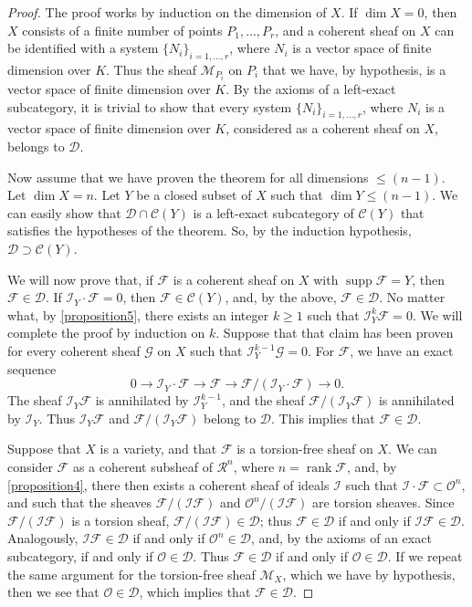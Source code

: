 \documentclass{article}
\theoremstyle{plain}
\theoremstyle{definition}
\newcommand{\sh}{\mathscr}
\newcommand{\cat}{\mathcal}
\renewcommand{\geq}{\geqslant}
\renewcommand{\leq}{\leqslant}
\DeclareMathOperator{\supp}{supp}
\DeclareMathOperator{\rank}{rank}
\newcommand{\oldpage}[1]{\marginpar{\footnotesize$\Big\vert$ \textit{p.~#1}}}
\begin{document}
\begin{proof}
  The proof works by induction on the dimension of $X$.
  If $\dim X=0$, then $X$ consists of a finite number of points $P_1,\ldots,P_r$, and a coherent sheaf on $X$ can be identified with a system $\{N_i\}_{i=1,\ldots,r}$, where $N_i$ is a vector space of finite dimension over $K$.
  Thus the sheaf $\sh{M}_{P_i}$ on $P_i$ that we have, by hypothesis, is a vector space of finite dimension over $K$.
  By the axioms of a left-exact subcategory, it is trivial to show that every system $\{N_i\}_{i=1,\ldots,r}$, where $N_i$ is a vector space of finite dimension over $K$, considered as a coherent sheaf on $X$, belongs to $\cat{D}$.

  Now assume that we have proven the theorem for all dimensions $\leq (n-1)$.
  Let $\dim X=n$.
  Let $Y$ be a closed subset of $X$ such that $\dim Y\leq(n-1)$.
  We can easily show that $\cat{D}\cap\cat{C}(Y)$ is a left-exact subcategory of $\cat{C}(Y)$ that satisfies the hypotheses of the theorem.
  So, by the induction hypothesis, $\cat{D}\supset\cat{C}(Y)$.

  We will now prove that, if $\sh{F}$ is a coherent sheaf on $X$ with $\supp\sh{F}=Y$, then $\sh{F}\in\cat{D}$.
  If $\sh{I}_Y\cdot\sh{F}=0$, then $\sh{F}\in\cat{C}(Y)$, and, by the above, $\sh{F}\in\cat{D}$.
  No matter what, by \cref{proposition5}, there exists an integer $k\geq1$ such that $\sh{I}_Y^k\sh{F}=0$.
  We will complete the proof by induction on $k$.
  Suppose that that claim has been proven for every coherent sheaf $\sh{G}$ on $X$ such that $\sh{I}_Y^{k-1}\sh{G}=0$.
  For $\sh{F}$, we have an exact sequence
  \[
    0 \to \sh{I}_Y\cdot\sh{F} \to \sh{F} \to \sh{F}/(\sh{I}_Y\cdot\sh{F}) \to 0.
  \]
  The sheaf $\sh{I}_Y\sh{F}$ is annihilated by $\sh{I}_Y^{k-1}$, and the sheaf $\sh{F}/(\sh{I}_Y\sh{F})$ is annihilated by $\sh{I}_Y$.
  Thus $\sh{I}_Y\sh{F}$ and $\sh{F}/(\sh{I}_Y\sh{F})$ belong to $\cat{D}$.
  This implies that $\sh{F}\in\cat{D}$.

  Suppose that $X$ is a variety, and that $\sh{F}$ is a torsion-free sheaf on $X$.
  We can consider $\sh{F}$ as a coherent subsheaf of $\sh{R}^n$, where $n=\rank\sh{F}$, and, by \cref{proposition4}, there then exists a coherent sheaf of ideals $\sh{I}$ such that $\sh{I}\cdot\sh{F}\subset\sh{O}^n$, and such that the sheaves $\sh{F}/(\sh{I}\sh{F})$ and $\sh{O}^n/(\sh{I}\sh{F})$ are torsion sheaves.
  Since $\sh{F}/(\sh{I}\sh{F})$ is a torsion sheaf, $\sh{F}/(\sh{I}\sh{F})\in\cat{D}$;
  thus $\sh{F}\in\cat{D}$ if and only if $\sh{I}\sh{F}\in\cat{D}$.
  Analogously, $\sh{I}\sh{F}\in\cat{D}$ if and only if $\sh{O}^n\in\cat{D}$, and, by the axioms of an exact subcategory, if and only if $\sh{O}\in\cat{D}$.
  Thus $\sh{F}\in\cat{D}$ if and only if
\oldpage{4-05}
  $\sh{O}\in\cat{D}$.
  If we repeat the same argument for the torsion-free sheaf $\sh{M}_X$, which we have by hypothesis, then we see that $\sh{O}\in\cat{D}$, which implies that $\sh{F}\in\cat{D}$.


\end{proof}
\end{document}
